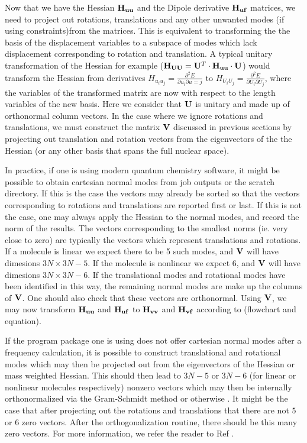 Now that we have the Hessian ${\bf{H_{uu}}}$ and the Dipole derivative ${\bf{H_{uf}}}$ matrices, we need to project out rotations, translations and any other unwanted modes
(if using constraints)from the matrices.  
This is equivalent to transforming the the basis of the displacement variables to a subspace of modes which lack displacement corresponding to rotation
and translation.  
A typical unitary transformation of the Hessian for example (${\bf{H_{UU}}}={\bf{U}}^T \cdot {\bf{H_{uu}}} \cdot {\bf{U}}$) would transform the Hessian from derivatives
$ H_{u_iu_j} = \frac{\partial^2 E}{\partial u_i \partial u=j}$ to $H_{U_iU_j}=\frac{\partial^2E}{\partial U_i \partial U_j}$, where the variables of the transformed matrix are now with respect
to the length variables of the new basis.  
Here we consider that ${\bf{U}}$ is unitary and made up of orthonormal column vectors.  
In the case where we ignore rotations and translations, we must construct the matrix ${\bf{V}}$ discussed in previous sections by projecting out translation and rotation
vectors from the eigenvectors of the the Hessian (or any other basis that spans the full nuclear space).  

  In practice, if one is using modern quantum chemistry software, it might be possible to obtain cartesian normal modes from job outputs or the scratch directory.  
 If this is the case the vectors may already be sorted so that the vectors corresponding to rotations and translations are reported first or last.  
 If this is not the case, one may always apply the Hessian to 
the normal modes, and record the norm of the results.  
The vectors corresponding to the smallest norms (ie. very close to zero) are typically the vectors which represent translations and rotations.
If a molecule is linear we expect there to be 5 such modes, and ${\bf{V}}$ will have dimesions $3N\times3N-5$.  
If the molecule is nonlinear we expect 6, and ${\bf{V}}$ will have dimesions $3N\times3N-6$.
If the translational modes and rotational modes have been identified in this way, the remaining normal modes are make up the columns of ${\bf{V}}$. 
One should also check that these vectors are orthonormal.  
Using ${\bf{V}}$, we may now transform ${\bf{H_{uu}}}$ and ${\bf{H_{uf}}}$ to ${\bf{H_{vv}}}$ and ${\bf{H_{vf}}}$ according to (flowchart and equation).

If the program package one is using does not offer cartesian normal modes after a frequency calculation, it is possible to construct translational and rotational modes which may then 
be projected out from the eigenvectors of the Hessian or mass weighted Hessian.  
This should then lead to $3N-5$ or $3N-6$ (for linear or nonlinear molecules respectively) nonzero 
vectors which may then be internally orthonormalized via the Gram-Schmidt method or otherwise \cite{numRec}.
It might be the case that after projecting out the rotations and translations that there are not $5$ or $6$ zero vectors.
After the orthogonalization routine, there should be this many zero vectors.  
For more information, we refer the reader to Ref \cite{numRec}.

